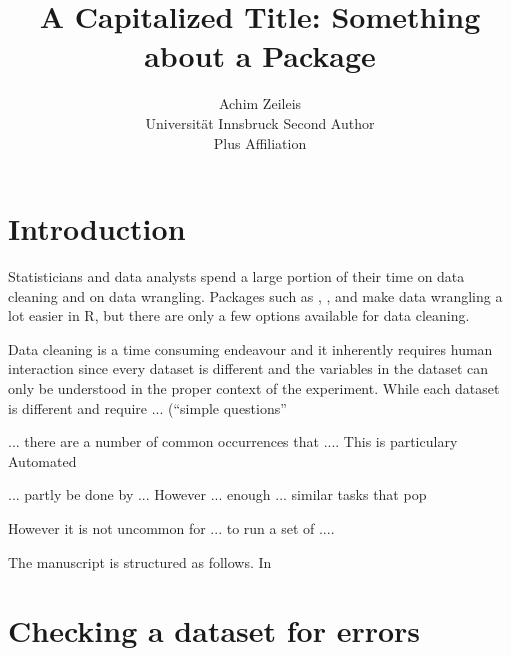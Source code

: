\documentclass[article]{jss}
\author{Achim Zeileis\\Universit\"at Innsbruck \And
        Second Author\\Plus Affiliation}
\title{A Capitalized Title: Something about a Package \pkg{cleanR}}
\begin{document}
\section{Introduction}
Statisticians and data analysts spend a large portion of their time on
data cleaning and on data wrangling. Packages such as \pkg{}, \pkg{},
and \pkg{} make data wrangling a lot easier in R, but there are only a
few options available for data cleaning.


Data cleaning is a time consuming endeavour and it inherently requires
human interaction since every dataset is different and the variables
in the dataset can only be understood in the proper context of the
experiment. While each dataset is different and require
... (``simple questions''

... there are a number of common occurrences that .... This is particulary
Automated


... partly be done by ... However ... enough ... similar tasks that
pop


However it is not uncommon for ... to run a set of ....


The manuscript is structured as follows. In


\section{Checking a dataset for errors} \label{sec:example1}
\end{document}
